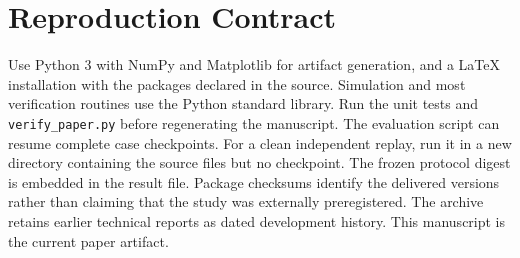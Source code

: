 \documentclass[10pt,a4paper]{article}
\begin{document}
\section{Reproduction Contract}
Use Python 3 with NumPy and Matplotlib for artifact generation, and a LaTeX
installation with the packages declared in the source. Simulation and most
verification routines use the Python standard library. Run the unit tests and
\texttt{verify\_paper.py} before regenerating the manuscript. The evaluation
script can resume complete case checkpoints. For a clean independent replay,
run it in a new directory containing the source files but no checkpoint.
The frozen protocol digest is embedded in the result file. Package checksums
identify the delivered versions rather than claiming that the study was
externally preregistered. The archive retains earlier technical reports as
dated development history. This manuscript is the current paper artifact.
\end{document}
